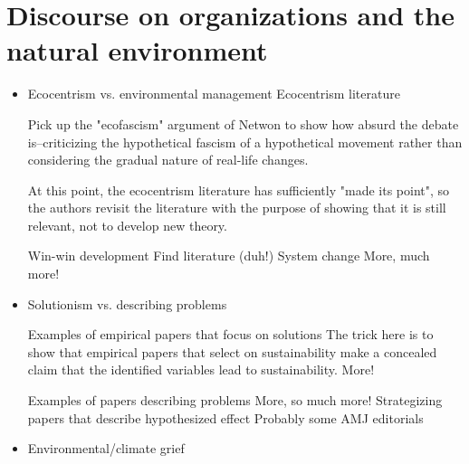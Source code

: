 \documentclass{article}
\begin{document}

	\section*{Discourse on organizations and the natural environment}

	\begin{itemize}
		\item Ecocentrism vs. environmental management
			\subitem Ecocentrism literature
				\subsubitem \citet{Catton1978}
				\subsubitem \citet{Catton1980}
				\subsubitem \citet{Shrivastava1994}
				\subsubitem \citet{Purser1995}
				\subsubitem \citet{Gladwin1995}
				\subsubitem \citet{Newton1997}
				\subsubitem \citet{Srikantia1997}
				\subsubitem \citet{Levy1997}

	\begin{paracol}{2}
				\subsubitem \citet{Newton2002}
				\switchcolumn
				Pick up the "ecofascism" argument of Netwon to show how absurd the debate is--criticizing the hypothetical fascism of a hypothetical movement rather than considering the gradual nature of real-life changes.
	\end{paracol}

				\subsubitem \citet{Springett2003}
				\subsubitem \citet{Hoffman2015}		

	\begin{paracol}{2}
				\subsubitem \citet{Ergene2020}
				\switchcolumn
				At this point, the ecocentrism literature has sufficiently "made its point", so the authors revisit the literature with the purpose of showing that it is still relevant, not to develop new theory.
	\end{paracol}

			\subitem Win-win development
				\subsubitem Find literature (duh!)
			\subitem System change
				\subsubitem \citet{Banerjee2003}
				\subsubitem \citet{Ergene2020}
				\subsubitem More, much more!
		\item Solutionism vs. describing problems

	\begin{paracol}{2}
			\subitem Examples of empirical papers that focus on solutions
			\switchcolumn
			The trick here is to show that empirical papers that select on sustainability make a concealed claim that the identified variables lead to sustainability.
			\switchcolumn
				\subsubitem \citet{Slawinski2012}
				\subsubitem More!
	\end{paracol}

			\subitem Examples of papers describing problems
				\subsubitem \citet{Wright2017}
				\subsubitem \citet{Cockerill2017}
				\subsubitem More, so much more!
			\subitem Strategizing papers that describe hypothesized effect
				\subsubitem \citet{Westoby2019}
				\subsubitem Probably some AMJ editorials
		\item Environmental/climate grief
			\subitem \citet{Cunsolo2018}
			\subitem \citet{Conroy2019}
	\end{itemize}
\end{document}

